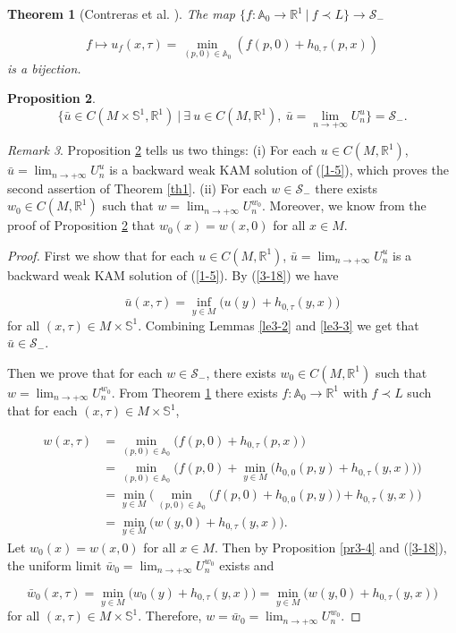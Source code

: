 \documentclass{amsart}[12pt]
\newtheorem{theorem}{Theorem}[section]
\theoremstyle{definition}
\newtheorem{proposition}[theorem]{Proposition}
\theoremstyle{remark}
\newtheorem{remark}[theorem]{Remark}
\numberwithin{equation}{section}
\begin{document}
\begin{theorem}[Contreras et al. \cite{Con}]\label{th4}
The map $\{f:\mathbb{A}_0\to\mathbb{R}^1\ |\ f\prec
L\}\to\mathcal{S}_-$

\[
f\mapsto
u_f(x,\tau)=\min_{(p,0)\in\mathbb{A}_0}(f(p,0)+h_{0,\tau}(p,x))
\]
is a bijection.
\end{theorem}

\begin{proposition}\label{pr3-5}
\[
\{\bar{u}\in C(M\times\mathbb{S}^1,\mathbb{R}^1)\ |\ \exists\ u\in
C(M,\mathbb{R}^1),\
\bar{u}=\lim_{n\to+\infty}U_n^u\}=\mathcal{S}_-.
\]
\end{proposition}

\begin{remark}
Proposition \ref{pr3-5} tells us two things: (i) For each $u\in
C(M,\mathbb{R}^1)$, $\bar{u}=\lim_{n\to+\infty}U_n^u$ is a
backward weak KAM solution of (\ref{1-5}), which proves the second
assertion of Theorem \ref{th1}. (ii) For each $w\in\mathcal{S}_-$
there exists $w_0\in C(M,\mathbb{R}^1)$ such that
$w=\lim_{n\to+\infty}U_n^{w_0}$. Moreover, we know from the proof
of Proposition \ref{pr3-5} that $w_0(x)=w(x,0)$ for all $x\in M$.
\end{remark}

\begin{proof}
First we show that for each $u\in C(M,\mathbb{R}^1)$,
$\bar{u}=\lim_{n\to+\infty}U^u_n$ is a backward weak KAM solution
of (\ref{1-5}). By (\ref{3-18}) we have

\[
\bar{u}(x,\tau)=\inf_{y\in M}\big(u(y)+h_{0,\tau}(y,x)\big)
\]
for all $(x,\tau)\in M\times\mathbb{S}^1$. Combining Lemmas
\ref{le3-2} and \ref{le3-3} we get that $\bar{u}\in\mathcal{S}_-$.

Then we prove that for each $w\in\mathcal{S}_-$, there exists
$w_0\in C(M,\mathbb{R}^1)$ such that
$w=\lim_{n\to+\infty}U^{w_0}_n$. From Theorem \ref{th4} there
exists $f:\mathbb{A}_0\to\mathbb{R}^1$ with $f\prec L$ such that
for each $(x,\tau)\in M\times\mathbb{S}^1$,

\begin{align*}
w(x,\tau) & =\min_{(p,0)\in\mathbb{A}_0}\big(f(p,0)+h_{0,\tau}(p,x)\big)\\
          & =\min_{(p,0)\in\mathbb{A}_0}\Big(f(p,0)+\min_{y\in
          M}\big(h_{0,0}(p,y)+h_{0,\tau}(y,x)\big)\Big)\\
          & =\min_{y\in
          M}\Big(\min_{(p,0)\in\mathbb{A}_0}\big(f(p,0)+h_{0,0}(p,y)\big)+h_{0,\tau}(y,x)\Big)\\
          & =\min_{y\in M}\big(w(y,0)+h_{0,\tau}(y,x)\big).
\end{align*}
Let $w_0(x)=w(x,0)$ for all $x\in M$. Then by Proposition
\ref{pr3-4} and (\ref{3-18}), the uniform limit
$\bar{w}_0=\lim_{n\to+\infty}U^{w_0}_n$ exists and

\[
\bar{w}_0(x,\tau)= \min_{y\in
M}\big(w_0(y)+h_{0,\tau}(y,x)\big)=\min_{y\in
M}\big(w(y,0)+h_{0,\tau}(y,x)\big)
\]
for all $(x,\tau)\in M\times\mathbb{S}^1$. Therefore,
$w=\bar{w}_0=\lim_{n\to+\infty}U^{w_0}_n$.

\end{proof}
\end{document}
